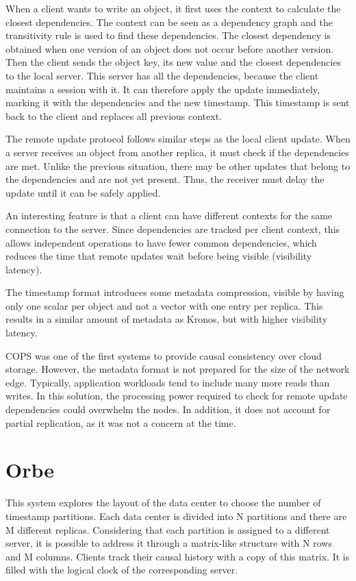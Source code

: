When a client wants to write an object, 
it first uses the context to calculate the closest dependencies. 
The context can be seen as a dependency graph and the transitivity rule is 
used to find these dependencies. 
The closest dependency is obtained when one version of an object does not occur 
before another version. 
Then the client sends the object key, 
its new value and the closest dependencies to the local server. 
This server has all the dependencies, 
because the client maintains a session with it. 
It can therefore apply the update immediately, 
marking it with the dependencies and the new timestamp. 
This timestamp is sent back to the client and replaces all previous context. 

The remote update protocol follows similar steps as the local client update. 
When a server receives an object from another replica, 
it must check if the dependencies are met. 
Unlike the previous situation, 
there may be other updates that belong to the dependencies and are not yet 
present. 
Thus, the receiver must delay the update until it can be safely applied. 

An interesting feature is that a client can have different contexts for the 
same connection to the server. 
Since dependencies are tracked per client context, 
this allows independent operations to have fewer common dependencies, 
which reduces the time that remote updates wait before being visible 
(visibility latency). 

The timestamp format introduces some metadata compression, 
visible by having only one scalar per object and not a vector with one entry 
per replica. 
This results in a similar amount of metadata as Kronos, 
but with higher visibility latency. 

COPS was one of the first systems to provide causal consistency over cloud 
storage. 
However, the metadata format is not prepared for the size of the network edge. 
Typically, application workloads tend to include many more reads than writes. 
In this solution, the processing power required to check for remote update 
dependencies could overwhelm the nodes. 
In addition, it does not account for partial replication, 
as it was not a concern at the time.

\section{Orbe}
\label{sec:soa:orbe}

This system \cite{du2013orbe}
explores the layout of the data center to choose the number of 
timestamp partitions. 
Each data center is divided into N partitions and there are M different 
replicas. 
Considering that each partition is assigned to a different server, 
it is possible to address it through a matrix-like structure with N rows and M 
columns. 
Clients track their causal history with a copy of this matrix. 
It is filled with the logical clock of the corresponding server. 

